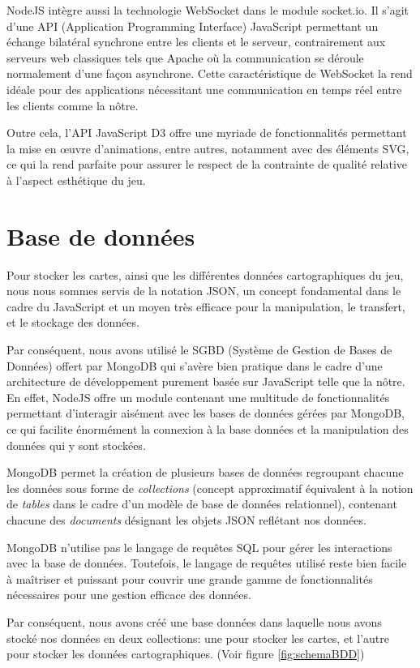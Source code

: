 \documentclass[12pt]{report}
\begin{document}
		NodeJS intègre aussi la technologie WebSocket dans le module socket.io. Il s'agit d'une API (Application Programming Interface) JavaScript permettant un échange bilatéral synchrone entre les clients et le serveur, contrairement aux serveurs web classiques tels que Apache où la communication se déroule normalement d'une façon asynchrone. Cette caractéristique de WebSocket la rend idéale pour des applications nécessitant une communication en temps réel entre les clients comme la nôtre.

		Outre cela, l'API JavaScript D3 offre une myriade de fonctionnalités permettant la mise en \oe{}uvre d'animations, entre autres, notamment avec des éléments SVG, ce qui la rend parfaite pour assurer le respect de la contrainte de qualité relative à l'aspect esthétique du jeu.

    \section{Base de données}
		Pour stocker les cartes, ainsi que les différentes données cartographiques du jeu, nous nous sommes servis de la notation JSON, un concept fondamental dans le cadre du JavaScript et un moyen très efficace pour la manipulation, le transfert, et le stockage des données.

		Par conséquent, nous avons utilisé le SGBD (Système de Gestion de Bases de Données) offert par MongoDB qui s'avère bien pratique dans le cadre d'une architecture de développement purement basée sur JavaScript telle que la nôtre. En effet, NodeJS offre un module contenant une multitude de fonctionnalités permettant d'interagir aisément avec les bases de données gérées par MongoDB, ce qui facilite énormément la connexion à la base données et la manipulation des données qui y sont stockées.

		MongoDB permet la création de plusieurs bases de données regroupant chacune les données sous forme de \textit{collections} (concept approximatif équivalent à la notion de \textit{tables} dans le cadre d'un modèle de base de données relationnel), contenant chacune des \textit{documents} désignant les objets JSON reflétant nos données.

		MongoDB n'utilise pas le langage de requêtes SQL pour gérer les interactions avec la base de données. Toutefois, le langage de requêtes utilisé reste bien facile à maîtriser et puissant pour couvrir une grande gamme de fonctionnalités nécessaires pour une gestion efficace des données.

		Par conséquent, nous avons créé une base données dans laquelle nous avons stocké nos données en deux collections: une pour stocker les cartes, et l'autre pour stocker les données cartographiques. (Voir figure \ref{fig:schemaBDD})
\end{document}
